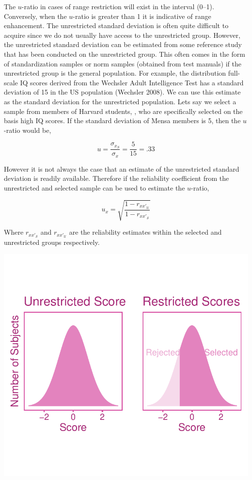 \documentclass[
  letterpaper,
  DIV=11,
  numbers=noendperiod]{scrreprt}
\begin{document}
The \(u\)-ratio in cases of range restriction will exist in the interval
(0--1). Conversely, when the \(u\)-ratio is greater than 1 it is
indicative of range enhancement. The unrestricted standard deviation is
often quite difficult to acquire since we do not usually have access to
the unrestricted group. However, the unrestricted standard deviation can
be estimated from some reference study that has been conducted on the
unrestricted group. This often comes in the form of standardization
samples or norm samples (obtained from test manuals) if the unrestricted
group is the general population. For example, the distribution
full-scale IQ scores derived from the Wechsler Adult Intelligence Test
has a standard deviation of 15 in the US population (Wechsler 2008). We
can use this estimate as the standard deviation for the unrestricted
population. Lets say we select a sample from members of Harvard
students, , who are specifically selected on the basis high IQ scores.
If the standard deviation of Mensa members is 5, then the \(u\)-ratio
would be,

\[
u =  \frac{\sigma_{x_S}}{\sigma_x} = \frac{5}{15}= .33
\]

However it is not always the case that an estimate of the unrestricted
standard deviation is readily available. Therefore if the reliability
coefficient from the unrestricted and selected sample can be used to
estimate the \(u\)-ratio,

\[
u_x = \sqrt{\frac{1-r_{xx'_{\mathcal{U}}}}{1-r_{xx'_{\mathcal{S}}}}}
\]

Where \(r_{xx'_{\mathcal{S}}}\) and \(r_{xx'_{\mathcal{U}}}\) are the
reliability estimates within the selected and unrestricted groups
respectively.

\includegraphics{indirect_range_restriction_files/figure-pdf/unnamed-chunk-1-1.pdf}
\end{document}
